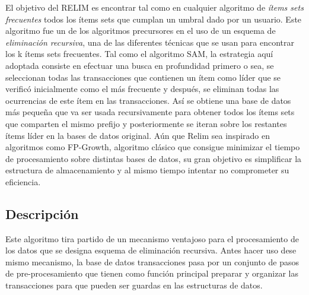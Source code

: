 \documentclass[12pt,spanish]{article}
\begin{document}
El objetivo del RELIM es encontrar tal como en cualquier algoritmo de \emph{ítems sets frecuentes} todos los ítems sets que cumplan un umbral dado por un usuario. Este algoritmo fue un de los algoritmos precursores en el uso de un esquema de \emph{eliminación recursiva}, una de las diferentes técnicas que se usan para encontrar los k ítems sets frecuentes. Tal como el algoritmo SAM, la estrategia aquí adoptada consiste en efectuar una busca en profundidad primero o sea, se seleccionan todas las transacciones que contienen un ítem como líder que se verificó inicialmente como el más frecuente y después, se eliminan todas las ocurrencias de este ítem en las transacciones. Así se obtiene una  base de datos más pequeña que va ser usada recursivamente para obtener todos los ítems sets que comparten el mismo prefijo y posteriormente se iteran sobre los restantes ítems líder en la bases de datos original. Aún que Relim sea inspirado en algoritmos como FP-Growth, algoritmo clásico que consigue minimizar el tiempo de procesamiento sobre distintas bases de datos, su gran objetivo es simplificar la estructura de almacenamiento y al mismo tiempo intentar no comprometer su eficiencia.  

\subsection{Descripción}

Este algoritmo tira partido de un mecanismo ventajoso para el procesamiento de los datos que se designa  esquema de eliminación recursiva. Antes hacer uso dese mismo mecanismo, la base de datos transacciones pasa por un conjunto de pasos de pre-procesamiento que tienen como función principal preparar y organizar las transacciones para que pueden ser guardas en las estructuras de datos. 
\end{document}
